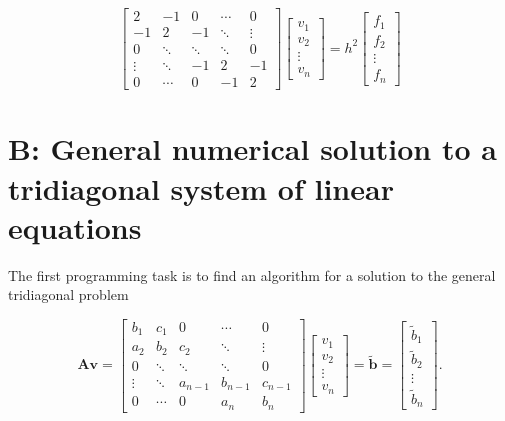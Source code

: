\documentclass[]{article}
\begin{document}
\begin{equation*}
\left[ \begin{matrix}
2 & -1 & 0 & \cdots & 0 \\
-1 & 2 & -1 & \ddots & \vdots \\
0 & \ddots & \ddots & \ddots & 0\\
\vdots & \ddots & -1 & 2 & -1 \\
0 & \cdots & 0 & -1 & 2
\end{matrix} \right]
\left[ \begin{matrix}
v_1 \\
v_2 \\
\vdots \\
v_n
\end{matrix} \right] = 
h^{2} \left[ \begin{matrix}
f_1 \\
f_2 \\
\vdots \\
f_n
\end{matrix} \right]
\end{equation*}



\section*{B: General numerical solution to a tridiagonal system of linear equations}
The first programming task is to find an algorithm for a solution to the general tridiagonal problem

\begin{equation*}
\mathbf{Av} = 
\left[ \begin{matrix}
b_1 & c_1 & 0 & \cdots & 0 \\
a_2 & b_2 & c_2 & \ddots & \vdots \\
0 & \ddots & \ddots & \ddots & 0 \\
\vdots & \ddots & a_{n-1} & b_{n-1} & c_{n-1} \\
0 & \cdots & 0 & a_n & b_n
\end{matrix} \right]
\left[ \begin{matrix}
v_1 \\
v_2 \\
\vdots \\
v_n
\end{matrix} \right] = 
\mathbf{\tilde{b}} = 
\left[ \begin{matrix}
\tilde{b}_1 \\
\tilde{b}_2 \\
\vdots \\
\tilde{b}_n
\end{matrix} \right] .
\end{equation*}
\end{document}
